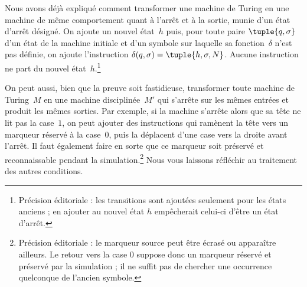 \documentclass[../../../include/open-logic-section]{subfiles}
\begin{document}
\begin{explain}
Nous avons déjà expliqué comment transformer une machine de
Turing en une machine de même comportement quant à l'arrêt
et à la sortie, munie d'un état
d'arrêt désigné. On ajoute un nouvel état~$h$ puis, pour toute
paire $\tuple{q,\sigma}$ d'un état de la machine initiale et
d'un symbole sur laquelle sa fonction~$\delta$ n'est pas
définie, on ajoute l'instruction
$\delta(q,\sigma)=\tuple{h,\sigma,N}$. Aucune instruction
ne part du nouvel état~$h$.\footnote{Précision éditoriale : les transitions sont ajoutées seulement pour les états anciens ; en ajouter au nouvel état $h$ empêcherait celui-ci d'être un état d'arrêt.}

On peut aussi, bien que la preuve soit fastidieuse, transformer
toute machine de Turing~$M$ en une machine disciplinée~$M'$
qui s'arrête sur les mêmes entrées et produit les mêmes sorties.
Par exemple, si la machine s'arrête alors que sa tête ne lit
pas la case~$1$, on peut ajouter des instructions qui ramènent
la tête vers un marqueur réservé à la case~$0$, puis la
déplacent d'une case vers la droite avant l'arrêt. Il faut
également faire en sorte que ce marqueur soit préservé et
reconnaissable pendant la simulation.\footnote{Précision éditoriale : le marqueur source peut être écrasé ou apparaître ailleurs. Le retour vers la case $0$ suppose donc un marqueur réservé et préservé par la simulation ; il ne suffit pas de chercher une occurrence quelconque de l'ancien symbole.} Nous vous laissons
réfléchir au traitement des autres conditions.
\end{explain}
\end{document}
